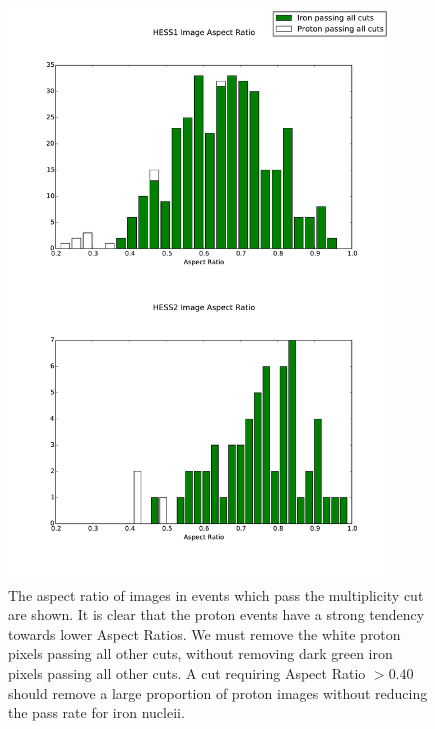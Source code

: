 \documentclass[11pt]{article}
\begin{document}
\begin{figure}
\begin{center}
\includegraphics[width=0.9\textwidth]{aspectratio}
\caption{The aspect ratio of images in events which pass the multiplicity cut are shown. It is clear that the proton events have a strong tendency towards lower Aspect Ratios. We must remove the white proton pixels passing all other cuts, without removing dark green iron pixels passing all other cuts. A cut requiring Aspect Ratio $> 0.40$ should remove a large proportion of proton images without reducing the pass rate for iron nucleii.}
\label{fig:aspectratio}
\end{center}
\end{figure}
\end{document}
